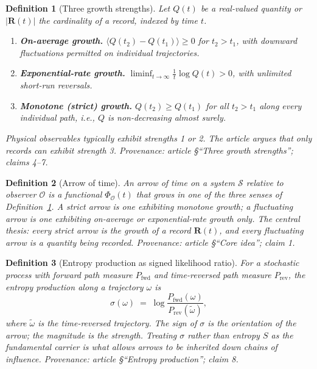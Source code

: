 \documentclass[11pt]{article}
\newtheorem{definition}{Definition}
\newcommand{\cO}{\mathcal{O}}
\newcommand{\cS}{\mathcal{S}}
\begin{document}
\begin{definition}[Three growth strengths]\label{def:growth}
Let $Q(t)$ be a real-valued quantity or $|\mathbf{R}(t)|$ the cardinality
of a record, indexed by time $t$.
\begin{enumerate}
  \item \textbf{On-average growth.}
    $\langle Q(t_2) - Q(t_1) \rangle \geq 0$ for $t_2 > t_1$, with downward
    fluctuations permitted on individual trajectories.
  \item \textbf{Exponential-rate growth.}
    $\liminf_{t \to \infty} \frac{1}{t}\log Q(t) > 0$, with unlimited
    short-run reversals.
  \item \textbf{Monotone (strict) growth.}
    $Q(t_2) \geq Q(t_1)$ for all $t_2 > t_1$ along every individual path,
    i.e., $Q$ is non-decreasing almost surely.
\end{enumerate}
Physical observables typically exhibit strengths 1 or 2.  The article argues
that only records can exhibit strength 3.
\emph{Provenance: article \S``Three growth strengths''; claims 4--7.}
\end{definition}

\begin{definition}[Arrow of time]\label{def:arrow}
An \emph{arrow of time} on a system $\cS$ relative to observer $\cO$ is a
functional $\Phi_\cO(t)$ that grows in one of the three senses of
Definition~\ref{def:growth}.  A \emph{strict arrow} is one exhibiting
monotone growth; a \emph{fluctuating arrow} is one exhibiting on-average
or exponential-rate growth only.  The central thesis: every strict arrow is
the growth of a record $\mathbf{R}(t)$, and every fluctuating arrow is a
quantity being recorded.
\emph{Provenance: article \S``Core idea''; claim 1.}
\end{definition}

\begin{definition}[Entropy production as signed likelihood ratio]\label{def:ep}
For a stochastic process with forward path measure $P_{\mathrm{fwd}}$ and
time-reversed path measure $P_{\mathrm{rev}}$, the \emph{entropy production}
along a trajectory $\omega$ is
\[
  \sigma(\omega) \;=\; \log \frac{P_{\mathrm{fwd}}(\omega)}{P_{\mathrm{rev}}(\tilde{\omega})},
\]
where $\tilde{\omega}$ is the time-reversed trajectory.  The \emph{sign} of
$\sigma$ is the orientation of the arrow; the \emph{magnitude} is the
strength.  Treating $\sigma$ rather than entropy $S$ as the fundamental
carrier is what allows arrows to be inherited down chains of influence.
\emph{Provenance: article \S``Entropy production''; claim 8.}
\end{definition}
\end{document}
